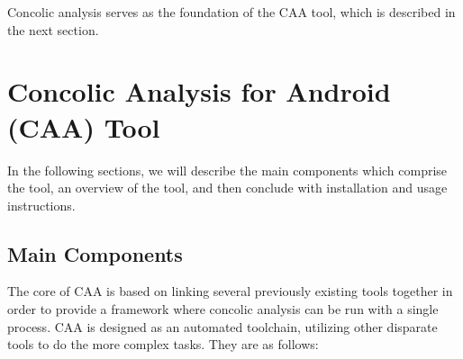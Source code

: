 \documentclass{sig-alternate-05-2015}
\newcommand{\sam}[1]{\textcolor{red}{{\it [Sam says: #1]}}}
\newcommand{\dan}[1]{\textcolor{blue}{{\it [Dan says: #1]}}}
\begin{document}
Concolic analysis serves as the foundation of the CAA tool, which is described in the next section.


\section{Concolic Analysis for Android (CAA) Tool}
\label{sec: caa}

In the following sections, we will describe the main components which comprise the tool, an overview of the tool, and then conclude with installation and usage instructions.

\subsection{Main Components}

The core of CAA is based on linking several previously existing tools together in order to provide a framework where concolic analysis can be run with a single process. CAA is designed as an automated toolchain, utilizing other disparate tools to do the more complex tasks. They are as follows:
\end{document}
